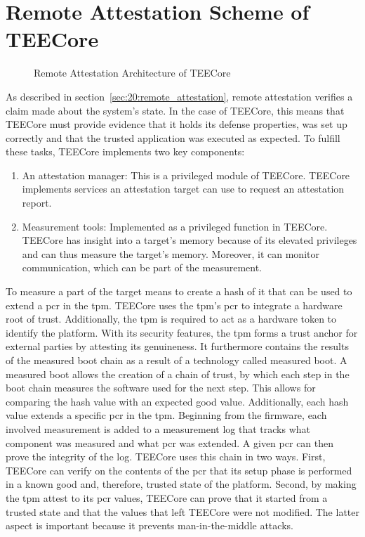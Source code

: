 \section{Remote Attestation Scheme of TEECore}
\label{sec:30:tee_ra_scheme}
\begin{figure}
  \begin{center}
    
    \caption{Remote Attestation Architecture of TEECore}
    \label{fig:30:tee_ra}
  \end{center}
\end{figure}
As described in section~\ref{sec:20:remote_attestation}, remote attestation
verifies a claim made about the system's state. In the case of TEECore, this
means that TEECore must provide evidence that it holds its defense properties,
was set up correctly and that the trusted application was executed as expected.
To fulfill these tasks, TEECore implements two key components:
\begin{enumerate}
  \item An attestation manager: This is a privileged module of
    TEECore. TEECore implements services an attestation target can use to
    request an attestation report.
  \item Measurement tools: Implemented as a privileged function in TEECore.
    TEECore has insight into a target's memory because of its elevated
    privileges and can thus measure the target's memory. Moreover, it can
    monitor communication, which can be part of the measurement.
\end{enumerate}

To measure a part of the target means to create a hash of it that can be used to
extend a \gls{pcr} in the \gls{tpm}. TEECore uses the \gls{tpm}'s \gls{pcr} to
integrate a hardware root of trust. Additionally, the \gls{tpm} is required to
act as a hardware token to identify the platform. With its security features,
the \gls{tpm} forms a trust anchor for external parties by attesting its
genuineness. It furthermore contains the results of the measured boot chain as a
result of a technology called measured boot. A measured boot allows the creation
of a chain of trust, by which each step in the boot chain measures the software
used for the next step. This allows for comparing the hash value with an
expected good value. Additionally, each hash value extends a specific \gls{pcr}
in the \gls{tpm}. Beginning from the firmware, each involved measurement is
added to a measurement log that tracks what component was measured and what
\gls{pcr} was extended. A given \gls{pcr} can then prove the integrity of the
log. TEECore uses this chain in two ways. First, TEECore can verify on the
contents of the \gls{pcr} that its setup phase is performed in a known good and,
therefore, trusted state of the platform. Second, by making the \gls{tpm} attest
to its \gls{pcr} values, TEECore can prove that it started from a trusted state
and that the values that left TEECore were not modified. The latter aspect is
important because it prevents man-in-the-middle attacks. \\

